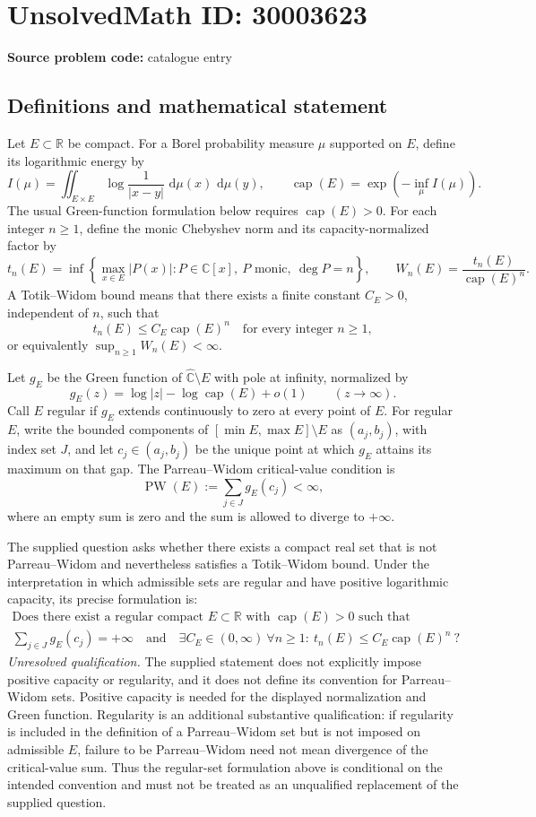 \documentclass[11pt]{article}
\newcommand{\R}{\mathbb{R}}
\newcommand{\C}{\mathbb{C}}
\newcommand{\dd}{\,\mathrm{d}}
\begin{document}
\section*{UnsolvedMath ID: 30003623}
\textbf{Source problem code:} catalogue entry
\subsection{Definitions and mathematical statement}
Let \(E\subset\R\) be compact. For a Borel probability measure \(\mu\) supported on \(E\), define its logarithmic energy by
\[
I(\mu)=\iint_{E\times E}\log\frac{1}{|x-y|}\,\dd\mu(x)\,\dd\mu(y),
\qquad
\operatorname{cap}(E)=\exp\!\left(-\inf_{\mu}I(\mu)\right).
\]
The usual Green-function formulation below requires \(\operatorname{cap}(E)>0\). For each integer \(n\geq1\), define the monic Chebyshev norm and its capacity-normalized factor by
\[
t_n(E)=\inf\left\{\max_{x\in E}|P(x)|:P\in\C[x],\ P\text{ monic},\ \deg P=n\right\},
\qquad
W_n(E)=\frac{t_n(E)}{\operatorname{cap}(E)^n}.
\]
A Totik--Widom bound means that there exists a finite constant \(C_E>0\), independent of \(n\), such that
\[
t_n(E)\leq C_E\operatorname{cap}(E)^n\quad\text{for every integer }n\geq1,
\]
or equivalently \(\sup_{n\geq1}W_n(E)<\infty\).

Let \(g_E\) be the Green function of \(\widehat{\C}\setminus E\) with pole at infinity, normalized by
\[
g_E(z)=\log|z|-\log\operatorname{cap}(E)+o(1)\qquad (z\to\infty).
\]
Call \(E\) regular if \(g_E\) extends continuously to zero at every point of \(E\). For regular \(E\), write the bounded components of \([\min E,\max E]\setminus E\) as \((a_j,b_j)\), with index set \(J\), and let \(c_j\in(a_j,b_j)\) be the unique point at which \(g_E\) attains its maximum on that gap. The Parreau--Widom critical-value condition is
\[
\operatorname{PW}(E):=\sum_{j\in J}g_E(c_j)<\infty,
\]
where an empty sum is zero and the sum is allowed to diverge to \(+\infty\).

The supplied question asks whether there exists a compact real set that is not Parreau--Widom and nevertheless satisfies a Totik--Widom bound. Under the interpretation in which admissible sets are regular and have positive logarithmic capacity, its precise formulation is:
\[
\begin{gathered}
\text{Does there exist a regular compact }E\subset\R\text{ with }\operatorname{cap}(E)>0\text{ such that}\\
\sum_{j\in J}g_E(c_j)=+\infty
\quad\text{and}\quad
\exists C_E\in(0,\infty)\ \forall n\geq1:\
 t_n(E)\leq C_E\operatorname{cap}(E)^n\ ?
\end{gathered}
\]
\textit{Unresolved qualification.} The supplied statement does not explicitly impose positive capacity or regularity, and it does not define its convention for Parreau--Widom sets. Positive capacity is needed for the displayed normalization and Green function. Regularity is an additional substantive qualification: if regularity is included in the definition of a Parreau--Widom set but is not imposed on admissible \(E\), failure to be Parreau--Widom need not mean divergence of the critical-value sum. Thus the regular-set formulation above is conditional on the intended convention and must not be treated as an unqualified replacement of the supplied question.
\end{document}
